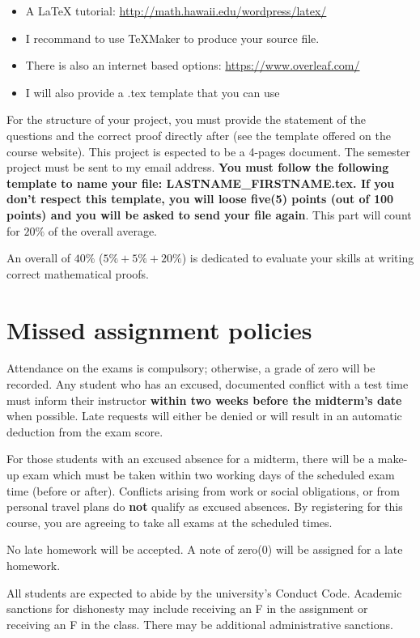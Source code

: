 \documentclass[12pt]{amsart}
\begin{document}
\begin{enumerate}
	\begin{itemize}
	\item A {\LaTeX} tutorial: \url{http://math.hawaii.edu/wordpress/latex/}
	\item I recommand to use {\TeX}Maker to produce your source file.
	\item There is also an internet based options: \url{https://www.overleaf.com/}
	\item I will also provide a .tex template that you can use
	\end{itemize}
	For the structure of your project, you must provide the statement of the questions and the correct proof directly after (see the template offered on the course website). This project is espected to be a 4-pages document. The semester project must be sent to my email address. \textbf{You must follow the following template to name your file: LASTNAME{\_}FIRSTNAME.tex. If you don't respect this template, you will loose five(5) points (out of 100 points) and you will be asked to send your file again}. This part will count for $20\%$ of the overall average.
\end{enumerate}
An overall of $40\%$ ($5\% + 5\% + 20\%$) is dedicated to evaluate your skills at writing correct mathematical proofs.

\section*{Missed assignment policies}

 Attendance on the exams is compulsory; otherwise, a grade of zero will be recorded. Any student who has an excused, documented conflict with a test time must inform their instructor \textbf{within two weeks before the midterm's date} when possible. Late requests will either be denied or will result in an automatic deduction from the exam score. 

For those students with an excused absence for a midterm, there will be a make-up exam which must be taken within two working days of the scheduled exam time (before or after). Conflicts arising from work or social obligations, or from personal travel plans do \textbf{not} qualify as excused absences. By registering for this course, you are agreeing to take all exams at the scheduled times.

 No late homework will be accepted. A note of zero(0) will be assigned for a late homework.

All students are expected to abide by the university's Conduct Code. Academic sanctions for dishonesty may include receiving an F in the assignment or receiving an F in the class. There may be additional administrative sanctions.
\end{document}
